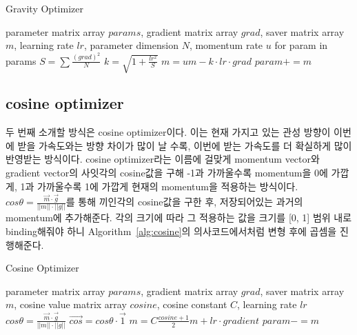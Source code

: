 \documentclass{article}
\begin{document}
\begin{algorithm}[tb]
   \caption{Gravity Optimizer}
   \label{alg:gravity}
\begin{algorithmic}
    parameter matrix array $params$, gradient matrix array $grad$, saver matrix array $m$, learning rate $lr$, parameter dimension $N$, momentum rate $u$
   \REPEAT
   \STATE for param in params
   \STATE $S=\sum{\frac{(grad)^2}{N}}$
   \STATE $k=\sqrt{1+\frac{lr^2}{S}}$
   \STATE $m=um-k\cdot lr\cdot grad$
   \STATE $param+=m$
   \ENDFOR
\end{algorithmic}
\end{algorithm}

\subsection{cosine optimizer}
두 번째 소개할 방식은 cosine optimizer이다. 이는 현재 가지고 있는 관성 방향이 이번에 받을 가속도와는 방향 차이가 많이 날 수록, 이번에 받는 가속도를 더 확실하게 많이 반영받는 방식이다. cosine optimizer라는 이름에 걸맞게 momentum vector와 gradient vector의 사잇각의 cosine값을 구해 -1과 가까울수록 momentum을 0에 가깝게, 1과 가까울수록 1에 가깝게 현재의 momentum을 적용하는 방식이다.\\$cos\theta=\frac{\vec{m}\cdot\vec{g}}{||m||\cdot||g||}$를 통해 끼인각의 cosine값을 구한 후, 저장되어있는 과거의 momentum에 추가해준다. 각의 크기에 따라 그 적용하는 값을 크기를 [0, 1] 범위 내로 binding해줘야 하니 Algorithm~\ref{alg:cosine}의 의사코드에서처럼 변형 후에 곱셈을 진행해준다.

\begin{algorithm}[tb]
   \caption{Cosine Optimizer}
   \label{alg:cosine}
\begin{algorithmic}
    parameter matrix array $params$, gradient matrix array $grad$, saver matrix array $m$, cosine value matrix array $cosine$, cosine constant $C$, learning rate $lr$
   \REPEAT
   \STATE $cos\theta=\frac{\vec{m}\cdot\vec{g}}{||m||\cdot||g||}$
   \STATE $\vec{cos}=cos\theta\cdot\vec{1}$
   \ENDFOR
   \STATE $m=C \frac{cosine+1}{2}m+lr\cdot gradient$
   \STATE $param-=m$
   \ENDFOR
\end{algorithmic}
\end{algorithm}
\end{document}
